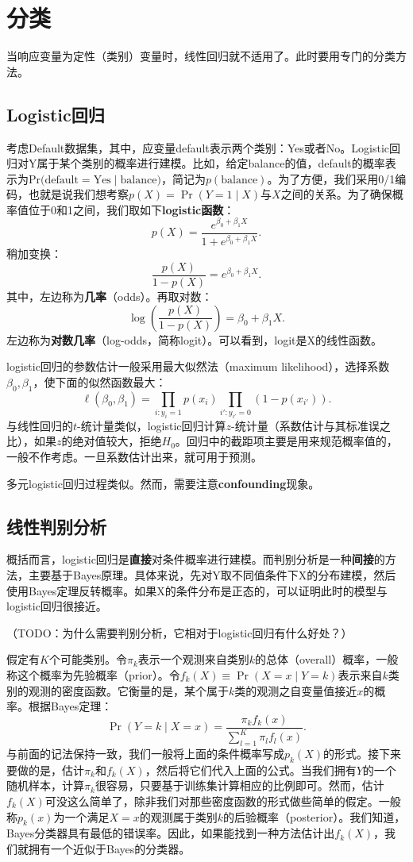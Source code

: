 \documentclass[hyperref,]{ctexart}
\begin{document}
\section{分类}

当响应变量为定性（类别）变量时，线性回归就不适用了。此时要用专门的分类方法。

\subsection{Logistic回归}\label{logistic}

考虑Default数据集，其中，应变量default表示两个类别：Yes或者No。Logistic回归对Y属于某个类别的概率进行建模。比如，给定balance的值，default的概率表示为\(\mathrm{Pr(default}=\mathrm{Yes}\mid \mathrm{balance)}\)，简记为\(p(\mathrm{balance})\)。为了方便，我们采用0/1编码，也就是说我们想考察\(p(X)=\Pr(Y=1\mid X)\)与\(X\)之间的关系。为了确保概率值位于0和1之间，我们取如下\textbf{logistic函数}：
\[p(X)=\frac{e^{\beta_0 + \beta_1 X}}{1+e^{\beta_0 + \beta_1 X}}.\]
稍加变换： \[\frac{p(X)}{1-p(X)}=e^{\beta_0 + \beta_1 X}.\]
其中，左边称为\textbf{几率}（odds）。再取对数：
\[\log(\frac{p(X)}{1-p(X)})=\beta_0 + \beta_1 X.\]
左边称为\textbf{对数几率}（log-odds，简称logit）。可以看到，logit是X的线性函数。

logistic回归的参数估计一般采用最大似然法（maximum
likelihood），选择系数\(\beta_0,\beta_1\)，使下面的似然函数最大：
\[\ell (\beta_0, \beta_1)=\prod_{i:y_i=1}p(x_i)\prod_{i':y_{i'}=0}(1-p(x_{i'})). \]
与线性回归的\(t\)-统计量类似，logistic回归计算\(z\)-统计量（系数估计与其标准误之比），如果\(z\)的绝对值较大，拒绝\(H_0\)。回归中的截距项主要是用来规范概率值的，一般不作考虑。一旦系数估计出来，就可用于预测。

多元logistic回归过程类似。然而，需要注意\textbf{confounding}现象。

\subsection{线性判别分析}

概括而言，logistic回归是\textbf{直接}对条件概率进行建模。而判别分析是一种\textbf{间接}的方法，主要基于Bayes原理。具体来说，先对Y取不同值条件下X的分布建模，然后使用Bayes定理反转概率。如果X的条件分布是正态的，可以证明此时的模型与logistic回归很接近。

（TODO：为什么需要判别分析，它相对于logistic回归有什么好处？）

假定有\(K\)个可能类别。令\(\pi_k\)表示一个观测来自类别\(k\)的总体（overall）概率，一般称这个概率为先验概率（prior）。令\(f_k(X)\equiv\Pr(X=x\mid Y=k)\)表示来自\(k\)类别的观测的密度函数。它衡量的是，某个属于\(k\)类的观测之自变量值接近\(x\)的概率。根据Bayes定理：
\[\Pr(Y=k\mid X=x)=\frac{\pi_k f_k(x)}{\sum_{l=1}^K \pi_l f_l(x)}.\]
与前面的记法保持一致，我们一般将上面的条件概率写成\(p_k(X)\)的形式。接下来要做的是，估计\(\pi_k\)和\(f_k(X)\)，然后将它们代入上面的公式。当我们拥有\(Y\)的一个随机样本，计算\(\pi_k\)很容易，只要基于训练集计算相应的比例即可。然而，估计\(f_k(X)\)可没这么简单了，除非我们对那些密度函数的形式做些简单的假定。一般称\(p_k(x)\)为一个满足\(X=x\)的观测属于类别\(k\)的后验概率（posterior）。我们知道，Bayes分类器具有最低的错误率。因此，如果能找到一种方法估计出\(f_k(X)\)，我们就拥有一个近似于Bayes的分类器。
\end{document}
